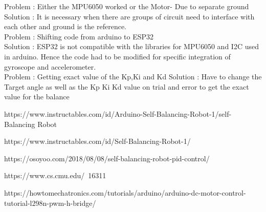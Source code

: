 \documentclass{article}
\begin{document}
  Problem : Either the MPU6050 worked or the Motor- Due to separate ground\\
  Solution : It is necessary when there are groups of circuit need to interface with each other and ground is the reference. \\
  
  Problem : Shifting code from arduino to ESP32\\
  Solution : ESP32 is not compatible with the libraries for MPU6050 and I2C used in arduino. Hence the code had to be modified for specific integration of gyroscope and accelerometer.\\
    
  Problem : Getting exact value of the Kp,Ki and Kd
  Solution : Have to change the Target angle as well as the Kp Ki Kd value on trial and error to get the exact value for the balance
    	
 	\pagebreak
 	\begin{thebibliography}{9}
 		{https://www.instructables.com/id/Arduino-Self-Balancing-Robot-1/}{self-Balancing Robot}
 		
 		{https://www.instructables.com/id/Self-Balancing-Robot-1/}
 		
 		{https://osoyoo.com/2018/08/08/self-balancing-robot-pid-control/}
 		
 		{https://www.cs.cmu.edu/~16311}
 		 
 		 {https://howtomechatronics.com/tutorials/arduino/arduino-dc-motor-control-tutorial-l298n-pwm-h-bridge/}
 		
 		
 	\end{thebibliography}
 	
\end{document}
